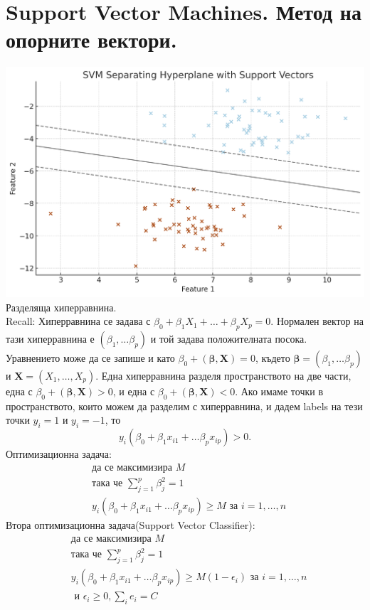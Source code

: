 \documentclass{article}
\begin{document}
\section{Support Vector Machines. Метод на опорните вектори.}	
\includegraphics[scale=0.5]{svn.png}
Разделяща хиперравнина. \\
Recall: Хиперравнина се задава с $\beta_0 + \beta_1 X_1 + \dots + \beta_p X_p = 0$. Нормален вектор на тази хиперравнина
е $(\beta_1, \dots \beta_p)$ и той задава положителната посока. Уравнението може да се запише и като $\beta_0 + (\boldsymbol \beta, \mathbf X) = 0 $, където 
$\boldsymbol \beta = (\beta_1, \dots \beta_p) $ и $\mathbf X = (X_1, \dots, X_p)$. Една хиперравнина разделя пространството на две части, една с $\beta_0 + (\boldsymbol \beta, \mathbf X) > 0 $, и една с $\beta_0 + (\boldsymbol \beta, \mathbf X) < 0 $. Ако имаме точки в пространството, които можем да разделим с хиперравнина, и дадем labels на тези точки $y_i = 1$ и $y_i=-1$, то 
$$y_i(\beta_0 + \beta_1 x_{i1} + \dots \beta_p x_{ip}) > 0 .$$
Оптимизационна задача:
\begin{align}
&\text{да се максимизира } M \\ 
&\text{така че } \sum_{j=1}^{p} \beta_j^2 = 1 \\
&	y_i(\beta_0 + \beta_1 x_{i1} + \dots \beta_p x_{ip}) \geq M \text{ за } i=1,\dots,n
\end{align}
Втора оптимизационна задача(Support Vector Classifier):
\begin{align}
&\text{да се максимизира } M \\ 
&\text{така че } \sum_{j=1}^{p} \beta_j^2 = 1 \\
&	y_i(\beta_0 + \beta_1 x_{i1} + \dots \beta_p x_{ip}) \geq M(1-\epsilon_i) \text{ за } i=1,\dots,n \\
& \text{ и } \epsilon_i \geq 0, \sum_i e_i = C 
\end{align}
\end{document}
